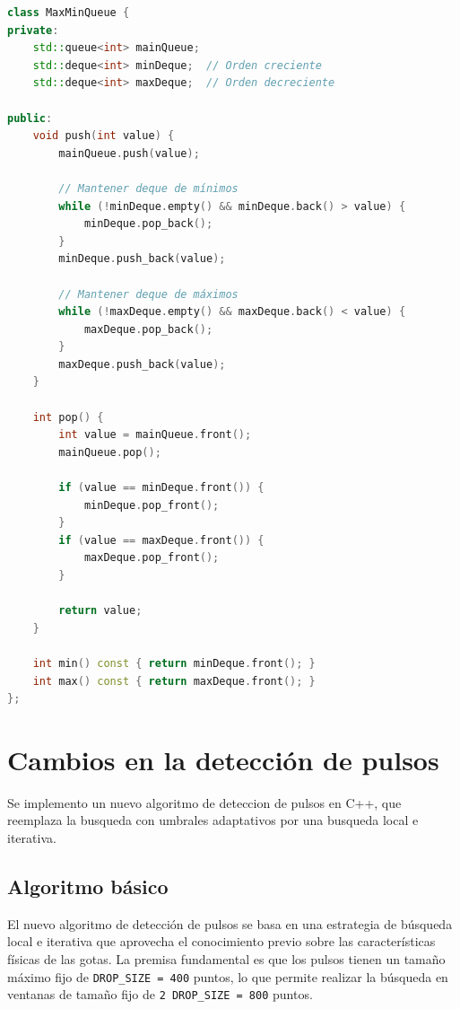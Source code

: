 \documentclass[12pt,a4paper]{article}
\begin{document}
\begin{lstlisting}[language=C++, label=lst:maxminqueue_simple]
class MaxMinQueue {
private:
    std::queue<int> mainQueue;
    std::deque<int> minDeque;  // Orden creciente
    std::deque<int> maxDeque;  // Orden decreciente

public:
    void push(int value) {
        mainQueue.push(value);
        
        // Mantener deque de mínimos
        while (!minDeque.empty() && minDeque.back() > value) {
            minDeque.pop_back();
        }
        minDeque.push_back(value);
        
        // Mantener deque de máximos
        while (!maxDeque.empty() && maxDeque.back() < value) {
            maxDeque.pop_back();
        }
        maxDeque.push_back(value);
    }
    
    int pop() {
        int value = mainQueue.front();
        mainQueue.pop();
        
        if (value == minDeque.front()) {
            minDeque.pop_front();
        }
        if (value == maxDeque.front()) {
            maxDeque.pop_front();
        }
        
        return value;
    }
    
    int min() const { return minDeque.front(); }
    int max() const { return maxDeque.front(); }
};
\end{lstlisting}

\section{Cambios en la detección de pulsos}
\lhead{}

Se implemento un nuevo algoritmo de deteccion de pulsos en C++, que reemplaza la busqueda con umbrales adaptativos por una busqueda local e iterativa.

\subsection{Algoritmo básico}

El nuevo algoritmo de detección de pulsos se basa en una estrategia de búsqueda local e iterativa que aprovecha el conocimiento previo sobre las características físicas de las gotas. La premisa fundamental es que los pulsos tienen un tamaño máximo fijo de \texttt{DROP\_SIZE = 400} puntos, lo que permite realizar la búsqueda en ventanas de tamaño fijo de \texttt{2 \times DROP\_SIZE = 800} puntos.
\end{document}
